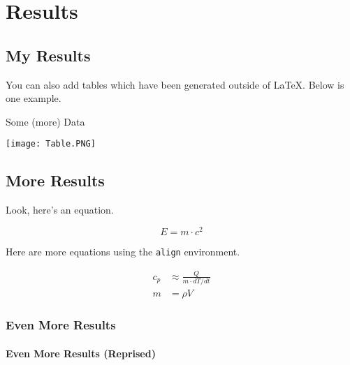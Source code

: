 \chapter{Results}
\label{ch:Results}

\section{My Results}

You can also add tables which have been generated outside of \LaTeX. Below is one example.

\begin{table}[h]
\centering
\caption{Some (more) Data}
\label{tab:more data}
\texttt{[image: Table.PNG]}
\end{table}

\section{More Results}

Look, here's an equation.

\begin{equation}
    E = m \cdot c^2
\end{equation}

Here are more equations using the \texttt{align} environment.

\begin{align}
    c_p &\approx \frac{Q}{m \cdot dT/dt} \\
    m &= \rho V
\end{align}

\subsection{Even More Results}

\lipsum[1]

\subsubsection{Even More Results (Reprised)}

